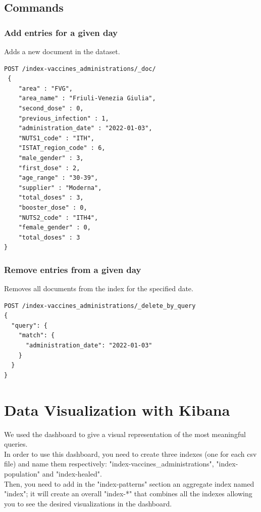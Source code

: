 \documentclass[12pt, a4paper]{article}
\begin{document}
\subsection{Commands}

\subsubsection{Add entries for a given day}
Adds a new document in the dataset.
\begin{tcolorbox}[fontupper=\scriptsize]
  \begin{verbatim}
POST /index-vaccines_administrations/_doc/
 {    
    "area" : "FVG",
    "area_name" : "Friuli-Venezia Giulia",
    "second_dose" : 0,
    "previous_infection" : 1,
    "administration_date" : "2022-01-03",
    "NUTS1_code" : "ITH",
    "ISTAT_region_code" : 6,
    "male_gender" : 3,
    "first_dose" : 2,
    "age_range" : "30-39",
    "supplier" : "Moderna",
    "total_doses" : 3,
    "booster_dose" : 0,
    "NUTS2_code" : "ITH4",
    "female_gender" : 0,
    "total_doses" : 3
}
  \end{verbatim}
\end{tcolorbox}

\subsubsection{Remove entries from a given day}
Removes all documents from the index for the specified date.
\begin{tcolorbox}[fontupper=\scriptsize]
  \begin{verbatim}
POST /index-vaccines_administrations/_delete_by_query
{
  "query": {
    "match": {
      "administration_date": "2022-01-03"
    }
  }
}
  \end{verbatim}
\end{tcolorbox}

\clearpage

\section{Data Visualization with Kibana}

We used the dashboard to give a visual representation of the most meaningful queries. \\
In order to use this dashboard, you need to create three indexes (one for each csv file)
and name them respectively: "index-vaccines\_administrations", "index-population" and 
"index-healed". \\
Then, you need to add in the "index-patterns" section an aggregate index named "index"; 
it will create an overall "index-*" that combines all the indexes allowing you to see 
the desired visualizations in the dashboard. 
\end{document}
